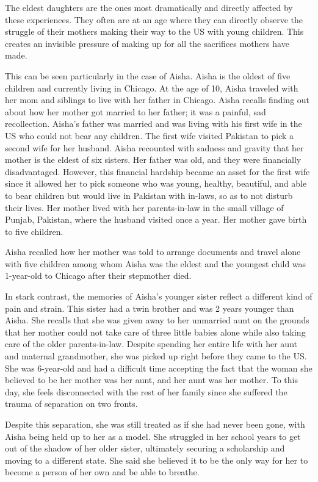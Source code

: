 The eldest daughters are the ones most dramatically and directly affected by these experiences. They often are at an age where they can directly observe the struggle of their mothers making their way to the US with young children. This creates an invisible pressure of making up for all the sacrifices mothers have made.

This can be seen particularly in the case of Aisha. Aisha is the oldest of five children and currently living in Chicago. At the age of 10, Aisha traveled with her mom and siblings to live with her father in Chicago. Aisha recalls finding out about how her mother got married to her father; it was a painful, sad recollection. Aisha’s father was married and was living with his first wife in the US who could not bear any children. The first wife visited Pakistan to pick a second wife for her husband. Aisha recounted with sadness and gravity that her mother is the eldest of six sisters. Her father was old, and they were financially disadvantaged. However, this financial hardship became an asset for the first wife since it allowed her to pick someone who was young, healthy, beautiful, and able to bear children but would live in Pakistan with in-laws, so as to not disturb their lives. Her mother lived with her parents-in-law in the small village of Punjab, Pakistan, where the husband visited once a year. Her mother gave birth to five children.

Aisha recalled how her mother was told to arrange documents and travel alone with five children among whom Aisha was the eldest and the youngest child was 1-year-old to Chicago after their stepmother died.

In stark contrast, the memories of Aisha’s younger sister reflect a different kind of pain and strain. This sister had a twin brother and was 2 years younger than Aisha. She recalls that she was given away to her unmarried aunt on the grounds that her mother could not take care of three little babies alone while also taking care of the older parents-in-law. Despite spending her entire life with her aunt and maternal grandmother, she was picked up right before they came to the US. She was 6-year-old and had a difficult time accepting the fact that the woman she believed to be her mother was her aunt, and her aunt was her mother. To this day, she feels disconnected with the rest of her family since she suffered the trauma of separation on two fronts.

Despite this separation, she was still treated as if she had never been gone, with Aisha being held up to her as a model. She struggled in her school years to get out of the shadow of her older sister, ultimately securing a scholarship and moving to a different state. She said she believed it to be the only way for her to become a person of her own and be able to breathe.

